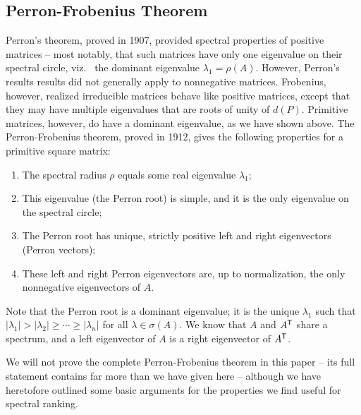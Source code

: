 \documentclass[../exploring-pagerank.tex]{subfiles}
\begin{document}
	\subsection{Perron-Frobenius Theorem}
	Perron's theorem, proved in 1907, provided spectral properties of positive matrices -- most notably, that such matrices have only one eigenvalue on their spectral circle, viz.~ the dominant eigenvalue $\lambda_1=\rho(A)$. However, Perron's results results did not generally apply to nonnegative matrices. Frobenius, however, realized irreducible matrices behave like positive matrices, except that they may have multiple eigenvalues that are roots of unity of $d(P)$. Primitive matrices, however, do have a dominant eigenvalue, as we have shown above. The Perron-Frobenius theorem, proved in 1912, gives the following properties for a primitive square matrix:
	\begin{enumerate}
		\item The spectral radius $\rho$ equals some real eigenvalue $\lambda_1$;
		\item This eigenvalue (the Perron root) is simple, and it is the only eigenvalue on the spectral circle;
		\item The Perron root has unique, strictly positive left and right eigenvectors (Perron vectors);
		\item These left and right Perron eigenvectors are, up to normalization, the only nonnegative eigenvectors of $A$.
	\end{enumerate}
	Note that the Perron root is a dominant eigenvalue; it is the unique $\lambda_1$ such that $|\lambda_1|>|\lambda_2|\geq\cdots\geq |\lambda_{n}|$ for all $\lambda \in \sigma(A)$. We know that $A$ and $A^{\mathsf{T}}$ share a spectrum, and a left eigenvector of $A$ is a right eigenvector of $A^{\mathsf{T}}$. 
	
	We will not prove the complete Perron-Frobenius theorem in this paper -- its full statement contains far more than we have given here -- although we have heretofore outlined some basic arguments for the properties we find useful for spectral ranking.
\end{document}

